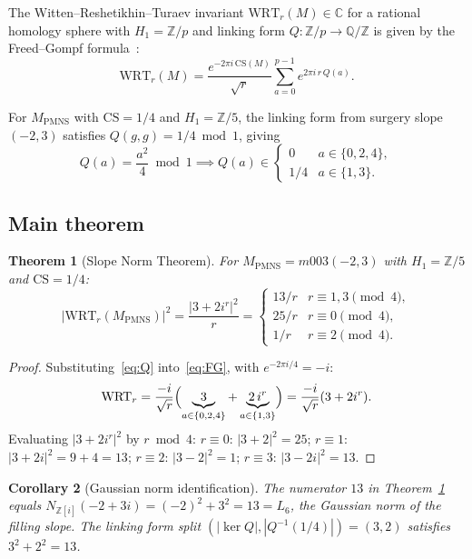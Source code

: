 \documentclass[11pt,a4paper]{article}
\newtheorem{theorem}{Theorem}
\newtheorem{corollary}[theorem]{Corollary}
\theoremstyle{definition}
\theoremstyle{remark}
\newcommand{\MPMNS}{M_{\mathrm{PMNS}}}
\newcommand{\ZZ}{\mathbb{Z}}
\newcommand{\QQ}{\mathbb{Q}}
\newcommand{\CC}{\mathbb{C}}
\newcommand{\Zfive}{\mathbb{Z}/5}
\newcommand{\Zi}{\mathbb{Z}[i]}
\newcommand{\CS}{\mathrm{CS}}
\newcommand{\WRT}{\mathrm{WRT}}
\begin{document}
The Witten--Reshetikhin--Turaev invariant $\WRT_r(M) \in \CC$ for a
rational homology sphere with $H_1 = \ZZ/p$ and linking form $Q: \ZZ/p \to \QQ/\ZZ$
is given by the Freed--Gompf formula~\cite{FreedGompf91}:
\begin{equation}
\WRT_r(M) = \frac{e^{-2\pi i\,\CS(M)}}{\sqrt{r}}
\sum_{a=0}^{p-1} e^{2\pi i\, r\, Q(a)}.
\label{eq:FG}
\end{equation}

For $\MPMNS$ with $\CS = 1/4$ and $H_1 = \Zfive$, the linking form
from surgery slope $(-2,3)$ satisfies $Q(g,g) = 1/4 \bmod 1$, giving
\begin{equation}
Q(a) = \frac{a^2}{4} \bmod 1
\implies
Q(a) \in \begin{cases} 0 & a \in \{0,2,4\}, \\ 1/4 & a \in \{1,3\}.\end{cases}
\label{eq:Q}
\end{equation}

\subsection{Main theorem}

\begin{theorem}[Slope Norm Theorem]
\label{thm:wrt}
For $\MPMNS = m003(-2,3)$ with $H_1 = \Zfive$ and $\CS = 1/4$:
\begin{equation}
|\WRT_r(\MPMNS)|^2
= \frac{|3 + 2i^r|^2}{r}
= \begin{cases}
13/r & r \equiv 1,3 \pmod{4}, \\
25/r & r \equiv 0 \pmod{4}, \\
1/r  & r \equiv 2 \pmod{4}.
\end{cases}
\label{eq:wrt}
\end{equation}
\end{theorem}

\begin{proof}
Substituting~\eqref{eq:Q} into~\eqref{eq:FG}, with $e^{-2\pi i/4} = -i$:
\begin{equation*}
\WRT_r = \frac{-i}{\sqrt{r}}
\Bigl(\underbrace{3}_{a \in \{0,2,4\}} + \underbrace{2\,i^r}_{a \in \{1,3\}}\Bigr)
= \frac{-i}{\sqrt{r}}(3 + 2i^r).
\end{equation*}
Evaluating $|3+2i^r|^2$ by $r \bmod 4$:
$r \equiv 0$: $|3+2|^2 = 25$;
$r \equiv 1$: $|3+2i|^2 = 9+4 = 13$;
$r \equiv 2$: $|3-2|^2 = 1$;
$r \equiv 3$: $|3-2i|^2 = 13$.
\end{proof}

\begin{corollary}[Gaussian norm identification]
The numerator $13$ in Theorem~\ref{thm:wrt} equals
$N_{\Zi}(-2+3i) = (-2)^2+3^2 = 13 = L_6$, the Gaussian norm
of the filling slope.
The linking form split $(|\ker Q|, |Q^{-1}(1/4)|) = (3,2)$
satisfies $3^2+2^2 = 13$.
\end{corollary}
\end{document}
